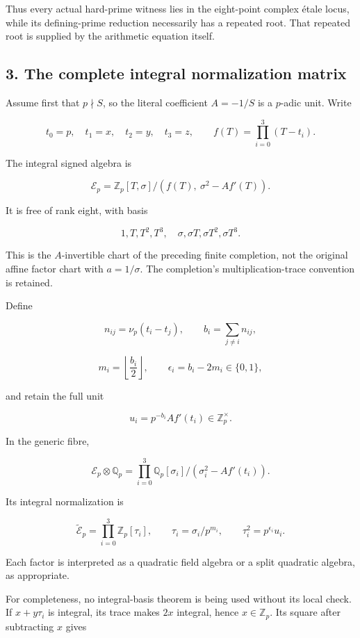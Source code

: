 Thus every actual hard-prime witness lies in the eight-point complex
étale locus, while its defining-prime reduction necessarily has a
repeated root. That repeated root is supplied by the arithmetic equation
itself.

\subsection{3. The complete integral normalization
matrix}\label{the-complete-integral-normalization-matrix}

Assume first that \(p\nmid S\), so the literal coefficient \(A=-1/S\) is
a \(p\)-adic unit. Write

\[
t_0=p,\quad t_1=x,\quad t_2=y,\quad t_3=z,
\qquad
f(T)=\prod_{i=0}^3(T-t_i).
\]

The integral signed algebra is

\[
\boxed{
\mathscr E_p=
\mathbb Z_p[T,\sigma]/
\left(f(T),\ \sigma^2-Af'(T)\right).
}
\tag{13}
\]

It is free of rank eight, with basis

\[
1,T,T^2,T^3,\quad
\sigma,\sigma T,\sigma T^2,\sigma T^3.
\]

This is the \(A\)-invertible chart of the preceding finite completion,
not the original affine factor chart with \(a=1/\sigma\). The
completion's multiplication-trace convention is retained.

Define

\[
n_{ij}=\nu_p(t_i-t_j),\qquad
b_i=\sum_{j\ne i}n_{ij},
\]

\[
m_i=\left\lfloor\frac{b_i}{2}\right\rfloor,\qquad
\epsilon_i=b_i-2m_i\in\{0,1\},
\]

and retain the full unit

\[
u_i=p^{-b_i}Af'(t_i)\in\mathbb Z_p^\times.
\]

In the generic fibre,

\[
\mathscr E_p\otimes\mathbb Q_p
=
\prod_{i=0}^3
\mathbb Q_p[\sigma_i]/(\sigma_i^2-Af'(t_i)).
\]

Its integral normalization is

\[
\boxed{
\widetilde{\mathscr E}_p
=
\prod_{i=0}^3
\mathbb Z_p[\tau_i],
\qquad
\tau_i=\sigma_i/p^{m_i},
\qquad
\tau_i^2=p^{\epsilon_i}u_i.
}
\tag{14}
\]

Each factor is interpreted as a quadratic field algebra or a split
quadratic algebra, as appropriate.

For completeness, no integral-basis theorem is being used without its
local check. If \(x+y\tau_i\) is integral, its trace makes \(2x\)
integral, hence \(x\in\mathbb Z_p\). Its square after subtracting \(x\)
gives

